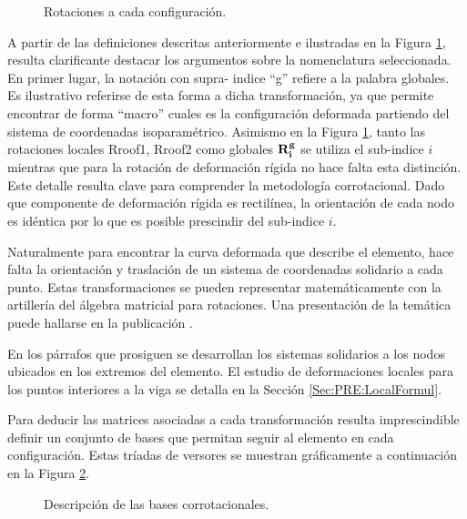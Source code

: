 \begin{figure}[htbp]
	\centering
	\def\svgwidth{100mm}
	
	\caption{Rotaciones a cada configuración.}
	\label{fig:PRE:IlusCorrotRot}
\end{figure}

A partir de las definiciones descritas anteriormente e ilustradas en la Figura \ref{fig:PRE:IlusCorrotRot}, resulta clarificante destacar los argumentos sobre la nomenclatura seleccionada. En primer lugar, la notación con supra- indice ``g'' refiere a la palabra globales. Es ilustrativo referirse de esta forma a dicha transformación, ya que permite encontrar de forma ``macro'' cuales es la configuración deformada partiendo del sistema de coordenadas isoparamétrico. Asimismo en la Figura \ref{fig:PRE:IlusCorrotRot}, tanto las rotaciones locales \gls{Rroof1}, \gls{Rroof2} como globales $\bf{R}_i^g$ se utiliza el sub-indice $i$ mientras que para la rotación de deformación rígida no hace falta esta distinción. Este detalle resulta clave para comprender la metodología corrotacional. Dado que componente de deformación rígida es rectilínea, la orientación de cada nodo es idéntica por lo que es posible prescindir del sub-indice $i$.

Naturalmente para encontrar la curva deformada que describe el elemento, hace falta la orientación y traslación de un sistema de coordenadas solidario a cada punto. Estas transformaciones se pueden representar matemáticamente con la artillería del álgebra matricial para rotaciones. Una presentación de la temática puede hallarse en la publicación \citep{kovzar1995finite}.

En los párrafos que prosiguen se desarrollan los sistemas solidarios a los nodos ubicados en los extremos del elemento. El estudio de deformaciones locales para los puntos interiores a la viga se detalla en la Sección \ref{Sec:PRE:LocalFormul}.

Para deducir las matrices asociadas a cada transformación resulta imprescindible definir un conjunto de bases que permitan seguir al elemento en cada configuración. Estas tríadas de versores se muestran gráficamente a continuación en la Figura \ref{fig:PRE:IlusCorrot}.

\begin{figure}[htbp]
	\centering
	\def\svgwidth{100mm}
	
	\caption{Descripción de las bases corrotacionales.}
	\label{fig:PRE:IlusCorrot}
\end{figure}


